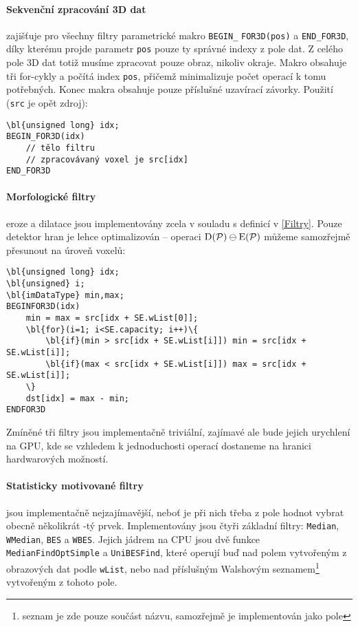         \paragraph{Sekvenční zpracování 3D dat} zajišťuje pro všechny filtry parametrické makro {\tt BEGIN\_} {\tt FOR3D(pos)} a {\tt END\_FOR3D}, díky kterému projde parametr {\tt pos} pouze ty správné indexy z pole dat. Z celého pole 3D dat totiž musíme zpracovat pouze obraz, nikoliv okraje. Makro obsahuje tři for-cykly a počítá index {\tt pos}, přičemž minimalizuje počet operací k tomu potřebných. Konec makra obsahuje pouze příslušné uzavírací závorky. Použití ({\tt src} je opět zdroj):

        \begin{Verbatim}[commandchars = \\\{\}]
\bl{unsigned long} idx;
BEGIN_FOR3D(idx)
    // tělo filtru
    // zpracovávaný voxel je src[idx]
END_FOR3D
        \end{Verbatim}

        \paragraph{Morfologické filtry} eroze a dilatace jsou implementovány zcela v souladu s definicí v \ref{Filtry}. Pouze detektor hran je lehce optimalizován -- operaci $\mathrm{D}(\mathcal{P}) \ominus \mathrm{E}(\mathcal{P})$ můžeme samozřejmě přesunout na úroveň voxelů:

        \begin{Verbatim}[commandchars = \\\{\}]
\bl{unsigned long} idx;
\bl{unsigned} i;
\bl{imDataType} min,max;
BEGINFOR3D(idx)
    min = max = src[idx + SE.wList[0]];
    \bl{for}(i=1; i<SE.capacity; i++)\{
        \bl{if}(min > src[idx + SE.wList[i]]) min = src[idx + SE.wList[i]];
        \bl{if}(max < src[idx + SE.wList[i]]) max = src[idx + SE.wList[i]];
    \}
    dst[idx] = max - min;
ENDFOR3D
        \end{Verbatim}

        Zmíněné tři filtry jsou implementačně triviální, zajímavé ale bude jejich urychlení na GPU, kde se vzhledem k jednoduchosti operací dostaneme na hranici hardwarových možností.

        \paragraph{Statisticky motivované filtry} jsou implementačně nejzajímavější, neboť je při nich třeba z pole hodnot vybrat obecně několikrát \kk-tý prvek. Implementovány jsou čtyři základní filtry: {\tt Median}, {\tt WMedian}, {\tt BES} a {\tt WBES}. Jejich jádrem na CPU jsou dvě funkce {\tt MedianFindOptSimple} a {\tt UniBESFind}, které operují buď nad polem vytvořeným z obrazových dat podle {\tt wList}, nebo nad příslušným Walshovým seznamem\footnote{seznam je zde pouze součást názvu, samozřejmě je implementován jako pole} vytvořeným z tohoto pole.

